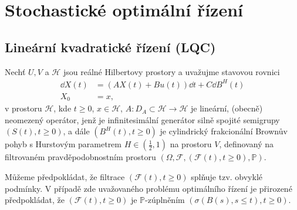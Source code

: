 
\chapter{Stochastické optimální řízení}


\section{Lineární kvadratické řízení (LQC)}
    \cite{duncan2012linear}
    Nechť $U,V$ a $\mathscr{H}$ jsou reálné Hilbertovy prostory a uvažujme
    stavovou rovnici
    \begin{align}
        \dd X(t) &= \left( A X(t) + B u(t) \right)\!\dd t + C \dd B^H(t)
        \label{eq:stateeq}\\
        X_0 &= x,
    \end{align}
    v prostoru $\mathscr{H}$, kde $t\geq0$, $x\in\mathscr{H}$, $A : D_A \subset
    \mathscr{H}\rightarrow\mathscr{H}$ je lineární, (obecně) neomezený
    operátor, jenž je infinitesimální generátor silně spojité semigrupy
    $\left(S(t),t\geq0\right)$, a dále $\left(B^H(t),t\geq0\right)$ je
    cylindrický frakcionální Brownův pohyb s Hurstovým parametrem 
    $H\in\left({\frac{1}{2},1}\right)$ na prostoru $V$, definovaný na
    filtrovaném pravděpodobnostním prostoru $\left( \Omega, \mathscr{F}, \left(
    \mathscr{F}(t),t\geq0\right),\mathbb{P} \right).$
    
    Můžeme předpokládat, že filtrace $\left( \mathscr{F}(t),
    t\geq0 \right)$ splňuje tzv. obvyklé podmínky. V případě zde uvažovaného
    problému optimálního řízení je přirozené předpokládat, že $\left( \mathscr{F}(t),
    t\geq0 \right)$ je $\mathbb{P}$-zúplněním $\left( \sigma \left( B(s), s\leq
    t \right),t\geq0 \right)$.
\\

